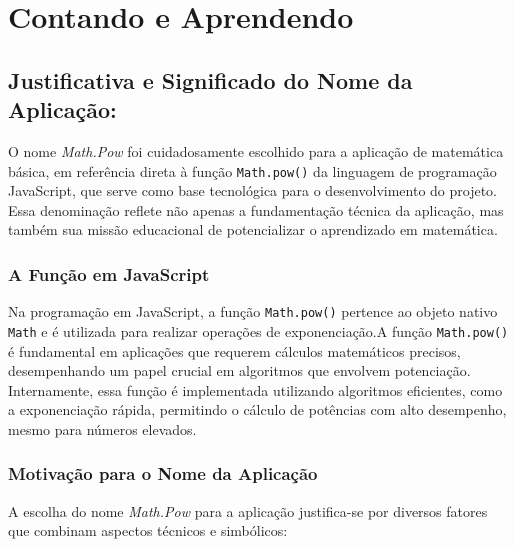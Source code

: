 \chapter{Contando e Aprendendo}\label{chp:mat}

\section{Justificativa e Significado do Nome da Aplicação: } 

O nome \textit{Math.Pow} foi cuidadosamente escolhido para a aplicação de matemática básica, em referência direta à função \texttt{Math.pow()} da linguagem de programação JavaScript, que serve como base tecnológica para o desenvolvimento do projeto. Essa denominação reflete não apenas a fundamentação técnica da aplicação, mas também sua missão educacional de potencializar o aprendizado em matemática.

\subsection{A Função  em JavaScript}

Na programação em JavaScript, a função \texttt{Math.pow()} pertence ao objeto nativo \texttt{Math} e é utilizada para realizar operações de exponenciação.A função \texttt{Math.pow()} é fundamental em aplicações que requerem cálculos matemáticos precisos, desempenhando um papel crucial em algoritmos que envolvem potenciação. Internamente, essa função é implementada utilizando algoritmos eficientes, como a exponenciação rápida, permitindo o cálculo de potências com alto desempenho, mesmo para números elevados.

\subsection{Motivação para o Nome da Aplicação}

A escolha do nome \textit{Math.Pow} para a aplicação justifica-se por diversos fatores que combinam aspectos técnicos e simbólicos:

